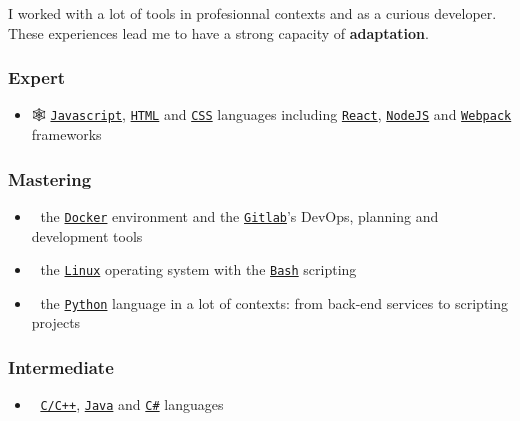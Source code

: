 \documentclass[11pt]{article}
\begin{document}
I worked with a lot of tools in profesionnal contexts and as a curious developer. These experiences lead me to have a strong capacity of \textbf{adaptation}.

\subsubsection{Expert}
\label{sec:orge2e42fe}

\begin{itemize}
\item 🕸 \href{https://www.javascript.com/}{\texttt{Javascript}}, \href{https://html.spec.whatwg.org/multipage/}{\texttt{HTML}} and \href{https://www.w3.org/Style/CSS/}{\texttt{CSS}} languages including \href{https://reactjs.org/}{\texttt{React}}, \href{https://nodejs.org}{\texttt{NodeJS}} and \href{https://webpack.js.org/}{\texttt{Webpack}} frameworks
\end{itemize}

\subsubsection{Mastering}
\label{sec:org378415e}
\begin{itemize}
\item 🐋 the \href{https://www.docker.com/}{\texttt{Docker}} environment and the \href{https://about.gitlab.com/}{\texttt{Gitlab}}'s DevOps, planning and development tools
\item 🐧 the \href{https://kernel.org/}{\texttt{Linux}} operating system with the \href{https://www.gnu.org/software/bash/}{\texttt{Bash}} scripting
\item 🐍 the \href{https://www.python.org/}{\texttt{Python}} language in a lot of contexts: from back-end services to scripting projects
\end{itemize}

\subsubsection{Intermediate}
\label{sec:org7acbffa}
\begin{itemize}
\item 🤖 \href{https://en.cppreference.com/w/}{\texttt{C/C++}}, \href{https://www.java.com/en/}{\texttt{Java}} and \href{https://dotnet.microsoft.com/en-us/}{\texttt{C\#}} languages
\end{itemize}
\end{document}
